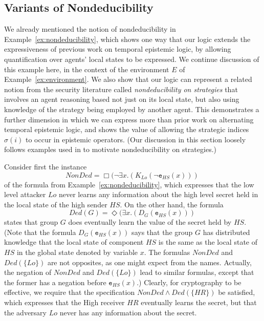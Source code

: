 \documentclass[a4wide]{article}
\theoremstyle{examplesty}
\newcommand{\strat}{\sigma}
\newcommand{\existsg}[1]{\exists #1.}
\newcommand{\lid}[2]{\mathtt{e}_{#1}(#2)}
\newcommand{\Env}{E}
\newcommand{\always}{\Box}
\newcommand{\sometimes}{\Diamond}
\newcommand{\Low}{Lo}
\begin{document}
\subsection{Variants of Nondeducibility} \label{sec:nonded} 

We already mentioned the notion of nondeducibility in Example~\ref{ex:nondeducibility}, 
which shows one way that our 
logic extends
the expressiveness of 
previous work on  temporal epistemic logic, by allowing 
quantification over agents' local states to be expressed. 
We continue discussion of this example here, in the context of the environment $\Env$ of 
Example~\ref{ex:environment}. We also show that our logic can represent a related notion from
 the security literature called \emph{nondeducibility on strategies} \cite{WJ90} that involves
an agent reasoning based not just on its local state, but
also using knowledge of the strategy being employed by another agent. 
This demonstrates a further dimension in which we can express more than prior work on 
alternating temporal epistemic logic, and shows the value of allowing the strategic indices 
$\strat(i)$ to occur in epistemic operators. 
(Our discussion in this section loosely follows examples used in \cite{WJ90}
to motivate nondeducibility on strategies.)  

Consider first the instance 
$$\mathit{NonDed}= \always( \neg \existsg{x}( K_{\Low} (\neg  \lid{HS}{x}))~$$ 
of the formula from Example~\ref{ex:nondeducibility},
which expresses that the low level attacker $\Low$ never learns any information about the high level secret 
held in the local state of the high sender $HS$. On the other hand, the formula
$$\mathit{Ded}(G) = \sometimes( \existsg{x}( D_{G} ( \lid{HS}{x}))~$$
 states that group  $G$ does eventually 
 learn the value of the secret held by $HS$.  (Note that the formula $D_{G} ( \lid{HS}{x})$ says that 
 the group $G$ has distributed knowledge that the local state of component $HS$ is the same as 
 the local state of $HS$ in the global state denoted by variable  $x$.
The formulas $\mathit{NonDed}$ and $\mathit{Ded}(\{\Low\})$ are not 
opposites,
 as one might expect from the names.
Actually, the negation of $\mathit{NonDed}$ and $\mathit{Ded}(\{\Low\})$ lead to similar formulas, except that the former has a negation before $\lid{HS}{x}$.) 
  Clearly, for cryptography to be effective, 
 we require that the specification $ \mathit{NonDed} \land \mathit{Ded}(\{HR\})$
 be satisfied, which expresses that the High receiver $HR$ eventually learns the secret, 
 but that the adversary $\Low$ never has any information about the secret. 
\end{document}
